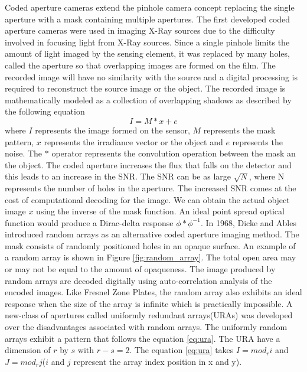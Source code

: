 Coded aperture cameras extend the pinhole camera concept replacing the single aperture with a mask containing multiple apertures. The first developed coded aperture cameras were used in imaging X-Ray sources due to the difficulty involved in focusing light from X-Ray sources\cite{Cannon1}. Since a single pinhole limits the amount of light imaged by the sensing element, it was replaced by many holes, called the aperture so that overlapping images are formed on the film. The recorded image will have no similarity with the source and a digital processing is required to reconstruct the source image or the object. The recorded image is mathematically modeled as a  collection of overlapping shadows as described by the following equation\cite{VBoomi}\cite{Cannon1} 
\begin{equation}
I = M * x + e
\label{eq:conv}
\end{equation}
where $I$ represents the image formed on the sensor, $M$ represents the mask pattern, $x$ represents the irradiance vector or the object and $e$ represents the noise. The $*$ operator represents the convolution operation between the mask an the object. The coded aperture increases the flux that falls on the detector and this leads to an increase in the SNR. The SNR can be as large $\sqrt{N}$, where N represents the number of holes in the aperture\cite{Cannon1}. The increased SNR comes at the cost of computational decoding for the image. We can obtain the actual object image $x$ using the inverse of the mask function. An ideal point spread optical function would produce a Dirac-delta response $\phi * \phi^{-1}$.
In 1968, Dicke and Ables\cite{Cannon1} introduced random arrays as an alternative coded aperture imaging method. The mask consists of randomly positioned holes in an opaque surface. An example of a random array is shown in Figure \ref{fig:random_array}. The total open area may or may not be equal to the amount of opaqueness. The image produced by random arrays are decoded digitally using auto-correlation analysis of the encoded images\cite{Cannon1}. Like Fresnel Zone Plates, the random array also exhibits an ideal response when the size of the array is infinite which is practically impossible. A new-class of apertures called uniformly redundant arrays(URAs) was developed over the disadvantages associated with random arrays. The uniformly random arrays exhibit a pattern that follows the equation \ref{eq:ura}\cite{Fenimore:78}. The URA have a dimension of $r$ by $s$ with $r - s = 2$. The equation \ref{eq:ura} takes $I  = mod_ri$ and $J  = mod_rj$($i$ and $j$ represent the array index position in x and y).
